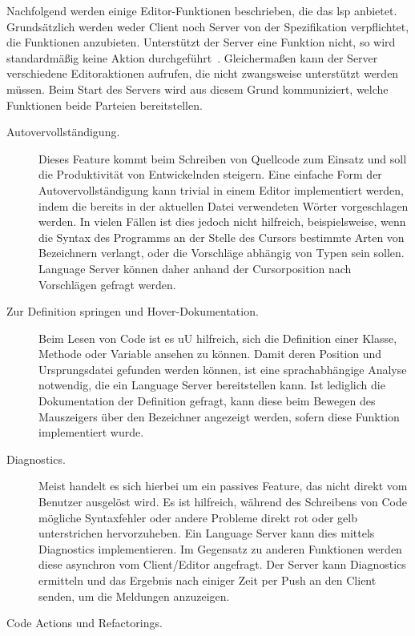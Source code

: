Nachfolgend werden einige Editor-Funktionen beschrieben, die das \ac{lsp} anbietet.
Grundsätzlich werden weder Client noch Server von der Spezifikation verpflichtet, die Funktionen anzubieten.
Unterstützt der Server eine Funktion nicht, so wird standardmäßig keine Aktion durchgeführt~\cite{lsp-overview}.
Gleichermaßen kann der Server verschiedene Editoraktionen aufrufen, die nicht zwangsweise unterstützt werden müssen.
Beim Start des Servers wird aus diesem Grund kommuniziert, welche Funktionen beide Parteien bereitstellen.\cite[Initialize Request]{lsp-spec}

\begin{description}
    \item[Autovervollständigung.]
    Dieses Feature kommt beim Schreiben von Quellcode zum Einsatz und soll die Produktivität von Entwickelnden steigern.
    Eine einfache Form der Autovervollständigung kann trivial in einem Editor implementiert werden, indem die bereits in der aktuellen Datei verwendeten Wörter vorgeschlagen werden.
    In vielen Fällen ist dies jedoch nicht hilfreich, beispielsweise, wenn die Syntax des Programms an der Stelle des Cursors bestimmte Arten von Bezeichnern verlangt, oder die Vorschläge abhängig von Typen sein sollen.
    Language Server können daher anhand der Cursorposition nach Vorschlägen gefragt werden.
    \item[Zur Definition springen und Hover-Dokumentation.]
    Beim Lesen von Code ist es \ac{uU} hilfreich, sich die Definition einer Klasse, Methode oder Variable ansehen zu können.
    Damit deren Position und Ursprungsdatei gefunden werden können, ist eine sprachabhängige Analyse notwendig, die ein Language Server bereitstellen kann.
    Ist lediglich die Dokumentation der Definition gefragt, kann diese beim Bewegen des Mauszeigers über den Bezeichner angezeigt werden, sofern diese Funktion implementiert wurde.
    \item[Diagnostics.]
    Meist handelt es sich hierbei um ein passives Feature, das nicht direkt vom Benutzer ausgelöst wird.
    Es ist hilfreich, während des Schreibens von Code mögliche Syntaxfehler oder andere Probleme direkt rot oder gelb unterstrichen hervorzuheben.
    Ein Language Server kann dies mittels Diagnostics implementieren.
    Im Gegensatz zu anderen Funktionen werden diese asynchron vom Client/Editor angefragt.
    Der Server kann Diagnostics ermitteln und das Ergebnis nach einiger Zeit per Push an den Client senden, um die Meldungen anzuzeigen.
    \item[Code Actions und Refactorings.]

\end{description}
